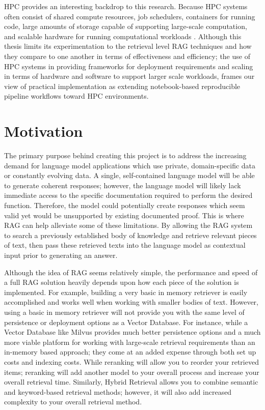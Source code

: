\ac{HPC} provides an interesting backdrop to this research. Because \ac{HPC} systems often consist of shared compute resources, job schedulers, containers for running code, large amounts of storage capable of supporting large-scale computation, and scalable hardware for running computational workloads \cite{kurtzer2017singularity,slurm2003,dongarra2020hpcsurvey}. Although this thesis limits its experimentation to the retrieval level \ac{RAG} techniques and how they compare to one another in terms of effectiveness and efficiency; the use of \ac{HPC} systems in providing frameworks for deployment requirements and scaling in terms of hardware and software to support larger scale workloads, frames our view of practical implementation as extending notebook-based reproducible pipeline workflows toward \ac{HPC} environments.

\section{Motivation}

The primary purpose behind creating this project is to address the increasing demand for language model applications which use private, domain-specific data or constantly evolving data. A single, self-contained language model will be able to generate coherent responses; however, the language model will likely lack immediate access to the specific documentation required to perform the desired function. Therefore, the model could potentially create responses which seem valid yet would be unsupported by existing documented proof. This is where \ac{RAG} can help alleviate some of these limitations. By allowing the \ac{RAG} system to search a previously established body of knowledge and retrieve relevant pieces of text, then pass these retrieved texts into the language model as contextual input prior to generating an answer.

Although the idea of \ac{RAG} seems relatively simple, the performance and speed of a full \ac{RAG} solution heavily depends upon how each piece of the solution is implemented. For example, building a very basic in memory retriever is easily accomplished and works well when working with smaller bodies of text. However, using a basic in memory retriever will not provide you with the same level of persistence or deployment options as a Vector Database. For instance, while a Vector Database like Milvus provides much better persistence options and a much more viable platform for working with large-scale retrieval requirements than an in-memory based approach; they come at an added expense through both set up costs and indexing costs. While reranking will allow you to reorder your retrieved items; reranking will add another model to your overall process and increase your overall retrieval time. Similarly, Hybrid Retrieval allows you to combine semantic and keyword-based retrieval methods; however, it will also add increased complexity to your overall retrieval method.

